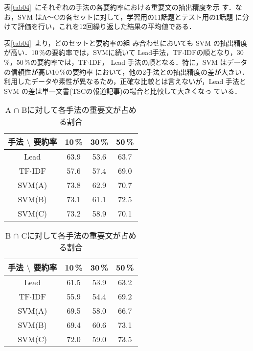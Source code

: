 表\ref{tab04}~にそれぞれの手法の各要約率における重要文の抽出精度を示
す．なお，SVM はA〜Cの各セットに対して，学習用の11話題とテスト用の1話題
に分けて評価を行い，これを12回繰り返した結果の平均値である．

表\ref{tab04}~より，どのセットと要約率の組
み合わせにおいても SVM の抽出精度が高い．10\,\%の要約率では，SVMに続いて
Lead手法，TF$\cdot$IDFの順となり，30\,\%，50\,\%の要約率では，TF$\cdot$IDF，
Lead 手法の順となる．特に，SVM はデータの信頼性が高い10\,\%の要約率
において，他の2手法との抽出精度の差が大きい．
利用したデータや素性が異なるため，正確な比較とは言えないが，Lead
手法とSVM
の差は単一文書(TSCの報道記事)の場合\cite{article53}と比較して大きくなっ
ている．

\begin{table}[t]
 \begin{center}
  \caption{A $\cap$ Bに対して各手法の重要文が占める割合}
  \label{tab05}
  \begin{tabular}{c|c|c|c}
   \hline
   \hline
   手法  $\setminus$ 要約率& 10\,\%  & 30\,\% & 50\,\% \\
   \hline
   Lead & 63.9 & 53.6 & 63.7\\
   TF$\cdot$IDF & 57.6 & 57.4 & 69.0\\
   \hline
   SVM(A) & 73.8 &  62.9& 70.7\\ 
   SVM(B) & 73.1 &  61.1& 72.5\\ 
   SVM(C) & 73.2 &  58.9 & 70.1\\ 
   \hline
  \end{tabular}
 \end{center}
\end{table}

\begin{table}[t]
 \begin{center}
  \caption{B $\cap$ Cに対して各手法の重要文が占める割合}
  \label{tab06}
  \begin{tabular}{c|c|c|c}
   \hline
   \hline
   手法  $\setminus$ 要約率& 10\,\%  & 30\,\% & 50\,\% \\
   \hline
   Lead & 61.5 & 53.9 & 63.2\\
   TF$\cdot$IDF & 55.9 & 54.4 & 69.2\\
   \hline
   SVM(A) & 69.5 &  58.0 & 66.7\\ 
   SVM(B) & 69.4 &  60.6 & 73.1\\ 
   SVM(C) & 72.0 &  59.0 & 73.5\\ 
   \hline
  \end{tabular}
 \end{center}
\end{table}

